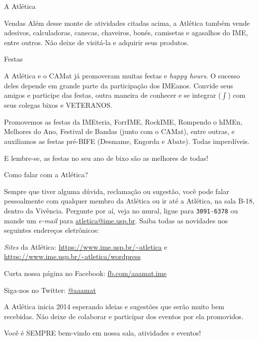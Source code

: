 \begin{secao}{A Atlética}
\begin{subsecao}{Vendas}
Além desse monte de atividades citadas acima, a Atlética também vende
adesivos, calculadoras, canecas, chaveiros, bonés, camisetas e agasalhos do IME,
entre outros. Não deixe de visitá-la e adquirir seus produtos.

\end{subsecao}

\begin{subsecao}{Festas}

A Atlética e o CAMat já promoveram muitas festas e \textit{happy hours}. O sucesso
deles depende em grande parte da participação dos IMEanos. Convide seus
amigos e participe das festas, outra maneira de conhecer e se
integrar ($\int$) com seus colegas bixos e VETERANOS.

Promovemos as festas da IMEteria, ForrIME, RockIME, Rompendo o hIMEn,
Melhores do Ano, Festival de Bandas (junto com o CAMat), entre outras, e
auxiliamos as festas pré-BIFE (Desmame, Engorda e Abate). Todas imperdíveis.

E lembre-se, as festas no seu ano de bixo são as melhores de todas!

\end{subsecao}

\begin{subsecao}{Como falar com a Atlética?}

Sempre que tiver alguma dúvida, reclamação ou sugestão, você pode falar
pessoalmente com qualquer membro da Atlética ou ir até a Atlética, na sala
B-18, dentro da Vivência. Pergunte por aí, veja no mural, ligue para {\tt 3091-6378} ou mande um \textit{e-mail} para \url{atletica@ime.usp.br}.
Saiba todas as novidades nos seguintes endereços eletrônicos:

\textit{Sites} da Atlética: \url{https://www.ime.usp.br/~atletica} e \url{https://www.ime.usp.br/~atletica/wordpress}

Curta nossa página no Facebook: \url{fb.com/aaamat.ime}

Siga-nos no Twitter: \url{@aaamat}

A Atlética inicia 2014 esperando ideias e sugestões que serão muito bem
recebidas. Não deixe de colaborar e participar dos eventos por ela promovidos.

Você é SEMPRE bem-vindo em nossa sala, atividades e eventos!

\end{subsecao}
\end{secao}
